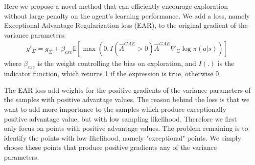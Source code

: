 Here we propose a novel method that can efficiently encourage exploration without large penalty on the agent's learning performance. We add a loss, namely Exceptional Advantage Regularization loss (EAR), to the original gradient of the variance parameters:
\begin{align}
g'_\Sigma = g_\Sigma + \beta_{exc} \mathbb{E} \left[
	\max\left(0,I(\hat{A}^{GAE}>0) \hat{A}^{GAE} \nabla_\Sigma \log \pi (a|s)\right)\right]
\end{align}
where $\beta_{exc} $ is the weight controlling the bias on exploration, and $I(.)$ is the indicator function, which returns 1 if the expression is true, otherwise 0.

The EAR loss add weights for the positive gradients of the variance parameters of the samples with positive advantage values. The reason behind the loss is that we want to add more importance to the samples which produce exceptionally positive advantage value, but with low sampling likelihood. Therefore we first only focus on points with positive advantage values. The problem remaining is to identify the points with low likelihood, namely "exceptional" points. We simply choose these points that produce positive gradients any of the variance parameters.
